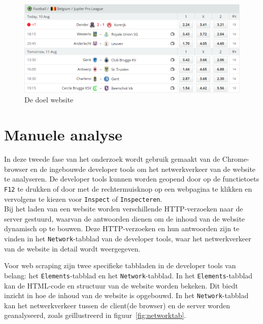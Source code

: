\begin{figure}[h]
    \centering
    \includegraphics[width=\linewidth]{graphics/website1.png}
    \caption{De doel website}
    \label{fig:website1}
\end{figure}

\section{Manuele analyse}
\label{sec:analyse}
In deze tweede fase van het onderzoek wordt gebruik gemaakt van de Chrome-browser en de ingebouwde developer tools om het netwerkverkeer van de website te analyseren. De developer tools kunnen worden geopend door op de functietoets \texttt{F12} te drukken of door met de rechtermuisknop op een webpagina te klikken en vervolgens te kiezen voor \texttt{Inspect} of \texttt{Inspecteren}.
\\
Bij het laden van een website worden verschillende HTTP-verzoeken naar de server gestuurd, waarvan de antwoorden dienen om de inhoud van de website dynamisch op te bouwen. Deze HTTP-verzoeken en hun antwoorden zijn te vinden in het \texttt{Network}-tabblad van de developer tools, waar het netwerkverkeer van de website in detail wordt weergegeven.

Voor web scraping zijn twee specifieke tabbladen in de developer tools van belang: het \texttt{Elements}-tabblad en het \texttt{Network}-tabblad. In het \texttt{Elements}-tabblad kan de HTML-code en structuur van de website worden bekeken. Dit biedt inzicht in hoe de inhoud van de website is opgebouwd. In het \texttt{Network}-tabblad kan het netwerkverkeer tussen de client(de browser) en de server worden geanalyseerd, zoals geïllustreerd in figuur~\ref{fig:networktab}.

